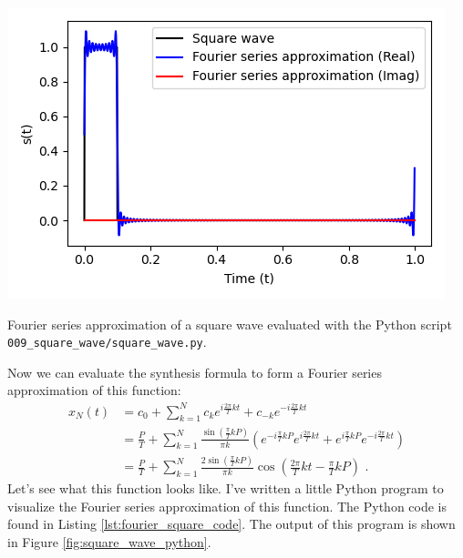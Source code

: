 \begin{marginfigure}
\begin{center}
\includegraphics[width=\textwidth]{code/009_square_wave/square_wave.png}
\end{center}
\caption{Fourier series approximation of a square wave evaluated with the Python script \texttt{009\_square\_wave/square\_wave.py}.}
\label{fig:square_wave_python}
\end{marginfigure}

Now we can evaluate the synthesis formula to form a Fourier series approximation of this function:
\begin{align}
x_N(t) & = c_0 + \sum_{k=1}^{N} c_k e^{i\frac{2\pi}{T}kt} + c_{-k} e^{-i\frac{2\pi}{T}kt} \\
   & = \frac{P}{T} + \sum_{k=1}^{N} \frac{\sin\left(\frac{\pi}{T} kP\right)}{\pi k}  \left(e^{-i\frac{\pi}{T}kP}e^{i\frac{2\pi}{T}kt} + e^{i\frac{\pi}{T}kP}e^{-i\frac{2\pi}{T}kt}\right) \\
   & = \frac{P}{T} + \sum_{k=1}^{N} \frac{2\sin\left(\frac{\pi}{T} kP\right)}{\pi k} \cos\left( \frac{2\pi}{T}kt-\frac{\pi}{T}kP\right) \,\,.
\end{align}
Let's see what this function looks like. I've written a little Python
program to visualize the Fourier series approximation of this
function. The Python code is found in
Listing \ref{lst:fourier_square_code}. The output of this program is shown in Figure \ref{fig:square_wave_python}.



